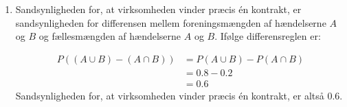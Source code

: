 \begin{solution}
\begin{enumerate}[label=(\alph*)]
        Sandsynligheden for, at virksomheden ikke vinder nogen af kontrakterne, er altså 0.2.
        
        \item Sandsynligheden for, at virksomheden vinder præcis én kontrakt, er sandsynligheden for differensen mellem foreningsmængden af hændelserne $A$ og $B$ og fællesmængden af hændelserne $A$ og $B$. Ifølge differensreglen er:
            
            \begin{align*}
                P((A \cup B) - (A \cap B)) &= P(A \cup B) - P(A \cap B) \\
                                            &= 0.8 - 0.2 \\
                                            &= 0.6
            \end{align*}
            Sandsynligheden for, at virksomheden vinder præcis én kontrakt, er altså 0.6.
            \end{enumerate}
\end{solution}


